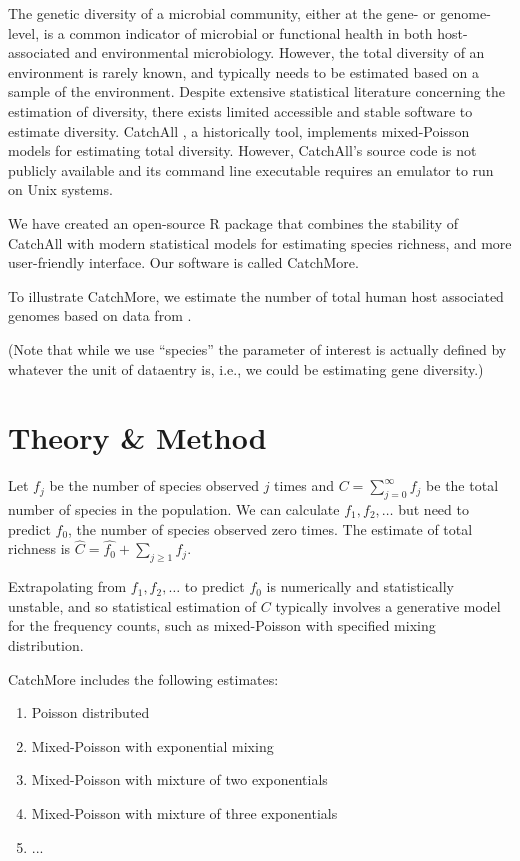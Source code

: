 \documentclass{bioinfo}
\begin{document}
The genetic diversity of a microbial community, either at the gene- or genome-level, is a common indicator of microbial or functional health in both host-associated and environmental microbiology. However, the total diversity of an environment is rarely known, and typically needs to be estimated based on a sample of the environment. Despite extensive statistical literature concerning the estimation of diversity, there exists limited accessible and stable software to estimate diversity. CatchAll \citep{Bunge:2012vm}, a historically tool, implements mixed-Poisson models for estimating total diversity. However, CatchAll's source code is not publicly available and its command line executable requires an emulator to run on Unix systems.

We have created an open-source R package that combines the stability of CatchAll with modern statistical models for estimating species richness, and more user-friendly interface. Our software is called CatchMore.

To illustrate CatchMore, we estimate the number of total human host associated genomes based on data from \cite{Pasolli:2019gu}.

(Note that while we use ``species'' the parameter of interest is actually defined by whatever the unit of dataentry is, i.e., we could be estimating gene diversity.)

\section{Theory \& Method}

Let $f_j$ be the number of species observed $j$ times and $C = \sum_{j = 0}^\infty f_j$ be the total number of species in the population. We can calculate $f_1, f_2, \ldots$ but need to predict $f_0$, the number of species observed zero times. The estimate of total richness is $\hat{C} = \hat{f_0} + \sum_{j \geq 1} f_j$.

Extrapolating from $f_1, f_2, \ldots$ to predict $f_0$ is numerically and statistically unstable, and so statistical estimation of $C$ typically involves a generative model for the frequency counts, such as mixed-Poisson with specified mixing distribution.

CatchMore includes the following estimates:
\begin{enumerate}
  \item Poisson distributed
\item Mixed-Poisson with exponential mixing
\item Mixed-Poisson with mixture of two exponentials
\item Mixed-Poisson with mixture of three exponentials
\item ...
\end{enumerate}
\end{document}

